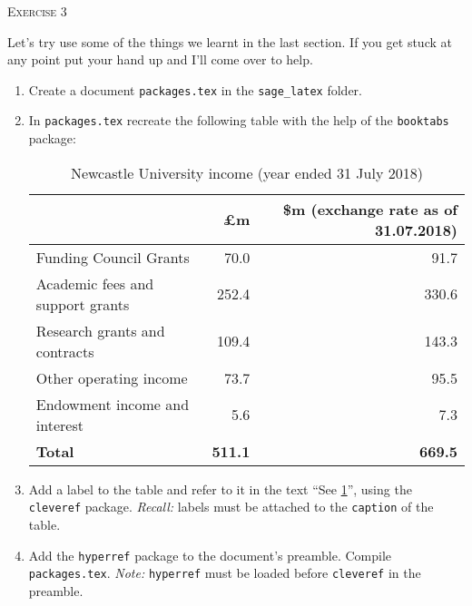 \documentclass{article}
\begin{document}
\begin{center}
  \Large\textsc{Exercise 3}
\end{center}

Let's try use some of the things we learnt in the last section. If you
get stuck at any point put your hand up and I'll come over to help.\\

\begin{enumerate}

  \item Create a document \texttt{packages.tex} in the \texttt{sage\_latex}
    folder.

  \item{ In \texttt{packages.tex} recreate the following table with the help of
    the \texttt{booktabs} package:

    \begin{table}[h]
      \begin{tabular}{@{}lrr@{}}
        \toprule
        & \textbf{£m} & \textbf{\$m (exchange rate as of 31.07.2018)} \\\midrule
        Funding Council Grants           & 70.0  & 91.7  \\
        Academic fees and support grants & 252.4 & 330.6 \\
        Research grants and contracts    & 109.4 & 143.3 \\
        Other operating income           & 73.7  & 95.5  \\
        Endowment income and interest    & 5.6   & 7.3   \\\midrule
        \textbf{Total} & \textbf{511.1} & \textbf{669.5} \\\bottomrule
      \end{tabular}
      \caption{Newcastle University income (year ended 31 July 2018)}
      \label{tab:newcy}
    \end{table}
  }

  \item Add a label to the table and refer to it in the text
    ``See \cref{tab:newcy}'', using the \texttt{cleveref} package.
    \textsl{Recall:} labels must be attached to the \texttt{caption} of the
    table.

  \item Add the \texttt{hyperref} package to the document's preamble.
    Compile \texttt{packages.tex}. \textsl{Note:} \texttt{hyperref} must be 
    loaded before \texttt{cleveref} in the preamble. 


\end{enumerate}
\end{document}
